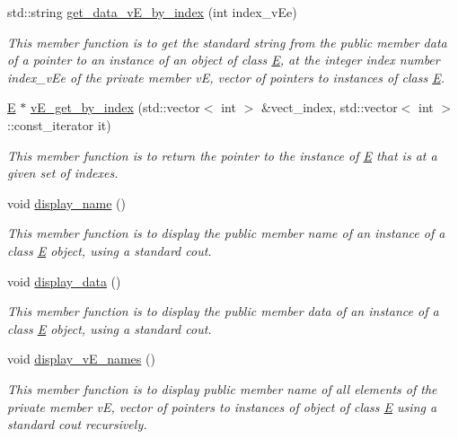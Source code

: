 \begin{DoxyCompactItemize}
std\+::string \hyperlink{group__group__get_gad93551b2c54e8fd17eae7181f0845ce2}{get\+\_\+data\+\_\+v\+E\+\_\+by\+\_\+index} (int index\+\_\+v\+Ee)
\begin{DoxyCompactList}\small\item\em This member function is to get the standard string from the public member \textquotesingle{}data\textquotesingle{} of a pointer to an instance of an object of class \hyperlink{classE}{E}, at the integer index number index\+\_\+v\+Ee of the private member vE, vector of pointers to instances of class \hyperlink{classE}{E}. \end{DoxyCompactList}\item 
\hyperlink{classE}{E} $\ast$ \hyperlink{group__group__get_ga144fc852ebad2c024934e6da7675bd68}{v\+E\+\_\+get\+\_\+by\+\_\+index} (std\+::vector$<$ int $>$ \&vect\+\_\+index, std\+::vector$<$ int $>$\+::const\+\_\+iterator it)
\begin{DoxyCompactList}\small\item\em This member function is to return the pointer to the instance of \hyperlink{classE}{E} that is at a given set of indexes. \end{DoxyCompactList}\item 
void \hyperlink{group__group__display_ga5e647273fd30acf7584882ac7c757813}{display\+\_\+name} ()
\begin{DoxyCompactList}\small\item\em This member function is to display the public member \textquotesingle{}name\textquotesingle{} of an instance of a class \hyperlink{classE}{E} object, using a standard cout. \end{DoxyCompactList}\item 
void \hyperlink{group__group__display_ga271f6ff8b0a5b5ee4e29fbd204ef0f24}{display\+\_\+data} ()
\begin{DoxyCompactList}\small\item\em This member function is to display the public member \textquotesingle{}data\textquotesingle{} of an instance of a class \hyperlink{classE}{E} object, using a standard cout. \end{DoxyCompactList}\item 
void \hyperlink{group__group__display_ga4494a0a02f6bcb42a857ba78c3ad774f}{display\+\_\+v\+E\+\_\+names} ()
\begin{DoxyCompactList}\small\item\em This member function is to display public member \textquotesingle{}name\textquotesingle{} of all elements of the private member vE, vector of pointers to instances of object of class \hyperlink{classE}{E} using a standard cout recursively. \end{DoxyCompactList}\item 

\end{DoxyCompactItemize}
